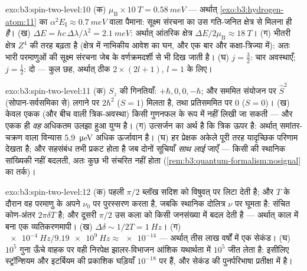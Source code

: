 \begin{solution}{exo:b3:spin-two-level:10}
(क) $\mu_{\text{B}} \times \qty{10}{T} = \qty{0.58}{meV}$ --- अर्थात्
\cref{exo:b3:hydrogen-atom:11} का
$\alpha^2E_{\text{I}} \approx \qty{0.7}{meV}$ वाला पैमाना: सूक्ष्म
संरचना  का उस गति-जनित क्षेत्र से मिलना ही \emph{है}। (ख) $\Delta E = hc\,\Delta\lambda/
\lambda^2 = \qty{2.1}{meV}$: अर्थात् आंतरिक क्षेत्र $\Delta E/2\mu_{
\text{B}} \approx \qty{18}{T}$। (ग) भीतरी क्षेत्र
$Z^4$ की तरह बढ़ता है (क्षेत्र में नाभिकीय आवेश का घन, और एक बार और
कक्षा-त्रिज्या में): अतः भारी परमाणुओं की सूक्ष्म संरचना जेब के
वर्णक्रमदर्शी से भी दिख जाती है। (घ) $j = \tfrac32$: चार अवस्थाएँ; $j = \tfrac12$: दो
--- कुल छह, अर्थात् ठीक $2 \times (2l + 1)$, $l = 1$ के लिए।
\end{solution}

\begin{solution}{exo:b3:spin-two-level:11}
(क) $S_z$ की गिनतियाँ: $+\hbar, 0, 0, -\hbar$; और सममित संयोजन पर
$\hat S^2$ (सोपान-सर्वसमिका से) लगाने पर
$2\hbar^2$ ($S = 1$) मिलता है, तथा प्रतिसममित पर $0$ ($S = 0$)। (ख)
केवल एकक (और बीच वाली त्रिक-अवस्था) किसी गुणनफल के रूप में नहीं लिखी
जा सकती --- और एकक ही \emph{वह} अधिकतम उलझा हुआ
युग्म है। (ग) उत्सर्जन का अर्थ है कि त्रिक ऊपर है: अर्थात् समांतर-चक्रण
वाला विन्यास \qty{5.9}{\micro eV} अधिक ऊर्जावान है। (घ)
हर प्रेक्षक अकेले पूरी तरह यादृच्छिक परिणाम देखता है; और
सहसंबंध तभी प्रकट होता है जब दोनों सूचियाँ \emph{साथ लाई}
जाएँ --- किसी की स्थानिक सांख्यिकी नहीं बदलती, अतः कुछ भी संचरित नहीं
होता (\cref{rem:b3:quantum-formalism:nosignal} का तर्क)।
\end{solution}

\begin{solution}{exo:b3:spin-two-level:12}
(क) पहली $\pi/2$ ब्लॉख सदिश को विषुवत् पर लिटा देती है; और
$T$ के दौरान वह परमाणु के अपने $\nu_0$ पर पुरस्सरण करता है, जबकि
स्थानिक दोलित्र $\nu$ पर घूमता है: संचित कोण-अंतर
$2\pi\delta T$ है; और दूसरी $\pi/2$ उस कला को किसी
जनसंख्या में बदल देती है --- अर्थात् काल में बना एक व्यतिकरणमापी। (ख) $\Delta\delta \sim
1/2T = \qty{1}{Hz}$। (ग) $\qty{e-4}{Hz}/\qty{9.19e9}{Hz} \approx
\num{e-14}$ --- अर्थात् तीस लाख वर्षों में एक सेकंड। (घ) $10^5$ गुना
ऊँचे वाहक पर वही निरपेक्ष झालर-विभाजन आंशिक यथार्थता में
$10^5$ जीत लेता है: इसीलिए स्ट्रॉन्शियम और इटर्बियम की
प्रकाशिक घड़ियाँ $10^{-18}$ पर हैं, और सेकंड की पुनर्परिभाषा
प्रतीक्षा में है।
\end{solution}

